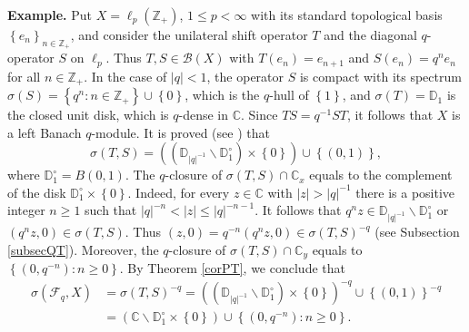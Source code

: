 \documentclass[12pt,reqno]{amsart}%
\theoremstyle{plain}
\numberwithin{theorem}{section} \numberwithin{equation}{section}
\numberwithin{lemma}{section}
\numberwithin{remark}{section}
\numberwithin{example}{section}
\numberwithin{proposition}{section}
\numberwithin{definition}{section}
\numberwithin{corollary}{section}
\begin{document}
\textbf{Example. }Put $X=\ell_{p}\left(  \mathbb{Z}_{+}\right)  $, $1\leq
p<\infty$ with its standard topological basis $\left\{  e_{n}\right\}
_{n\in\mathbb{Z}_{+}}$, and consider the unilateral shift operator $T$ and the
diagonal $q$-operator $S$ on $\ell_{p}$. Thus $T,S\in\mathcal{B}\left(
X\right)  $ with $T\left(  e_{n}\right)  =e_{n+1}$ and $S\left(  e_{n}\right)
=q^{n}e_{n}$ for all $n\in\mathbb{Z}_{+}$. In the case of $\left\vert
q\right\vert <1$, the operator $S$ is compact with its spectrum $\sigma\left(
S\right)  =\left\{  q^{n}:n\in\mathbb{Z}_{+}\right\}  \cup\left\{  0\right\}
$, which is the $q$-hull of $\left\{  1\right\}  $, and $\sigma\left(
T\right)  =\mathbb{D}_{1}$ is the closed unit disk, which is $q$-dense in
$\mathbb{C}$. Since $TS=q^{-1}ST$, it follows that $X$ is a left Banach
$q$-module. It is proved (see \cite{Dosi242}) that
\[
\sigma\left(  T,S\right)  =\left(  \left(  \mathbb{D}_{\left\vert q\right\vert
^{-1}}\backslash\mathbb{D}_{1}^{\circ}\right)  \times\left\{  0\right\}
\right)  \cup\left\{  \left(  0,1\right)  \right\}  ,
\]
where $\mathbb{D}_{1}^{\circ}=B\left(  0,1\right)  $. The $q$-closure of
$\sigma\left(  T,S\right)  \cap\mathbb{C}_{x}$ equals to the complement of the
disk $\mathbb{D}_{1}^{\circ}\times\left\{  0\right\}  $. Indeed, for every
$z\in\mathbb{C}$ with $\left\vert z\right\vert >\left\vert q\right\vert ^{-1}$
there is a positive integer $n\geq1$ such that $\left\vert q\right\vert
^{-n}<\left\vert z\right\vert \leq\left\vert q\right\vert ^{-n-1}$. It follows
that $q^{n}z\in\mathbb{D}_{\left\vert q\right\vert ^{-1}}\backslash
\mathbb{D}_{1}^{\circ}$ or $\left(  q^{n}z,0\right)  \in\sigma\left(
T,S\right)  $. Thus $\left(  z,0\right)  =q^{-n}\left(  q^{n}z,0\right)
\in\sigma\left(  T,S\right)  ^{-q}$ (see Subsection \ref{subsecQT}). Moreover,
the $q$-closure of $\sigma\left(  T,S\right)  \cap\mathbb{C}_{y}$ equals to
$\left\{  \left(  0,q^{-n}\right)  :n\geq0\right\}  $. By Theorem \ref{corPT},
we conclude that%
\begin{align*}
\sigma\left(  \mathcal{F}_{q},X\right)   &  =\sigma\left(  T,S\right)
^{-q}=\left(  \left(  \mathbb{D}_{\left\vert q\right\vert ^{-1}}%
\backslash\mathbb{D}_{1}^{\circ}\right)  \times\left\{  0\right\}  \right)
^{-q}\cup\left\{  \left(  0,1\right)  \right\}  ^{-q}\\
&  =\left(  \mathbb{C}\backslash\mathbb{D}_{1}^{\circ}\times\left\{
0\right\}  \right)  \cup\left\{  \left(  0,q^{-n}\right)  :n\geq0\right\}  .
\end{align*}
\end{document}
